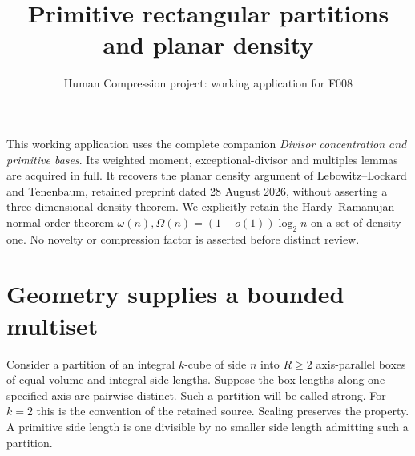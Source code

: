 \documentclass[11pt,a4paper]{article}
\title{Primitive rectangular partitions and planar density}
\author{Human Compression project: working application for F008}
\date{}
\newcommand{\om}{\omega}
\newcommand{\Om}{\Omega}
\begin{document}
\maketitle
This working application uses the complete companion
\emph{Divisor concentration and primitive bases}. Its weighted moment,
exceptional-divisor and multiples lemmas are acquired in full. It recovers
the planar density argument of Lebowitz--Lockard and Tenenbaum, retained
preprint dated 28 August 2026, without asserting a three-dimensional
density theorem. We explicitly retain the Hardy--Ramanujan normal-order
theorem $\om(n),\Om(n)=(1+o(1))\log_2 n$ on a set of density one.
No novelty or compression factor is asserted before distinct review.

\section{Geometry supplies a bounded multiset}
Consider a partition of an integral $k$-cube of side $n$ into $R\ge2$
axis-parallel boxes of equal volume and integral side lengths. Suppose
the box lengths along one specified axis are pairwise distinct. Such a
partition will be called strong. For $k=2$ this is the convention of
the retained source. Scaling preserves the property. A primitive side
length is one divisible by no smaller side length admitting such a
partition.
\end{document}
